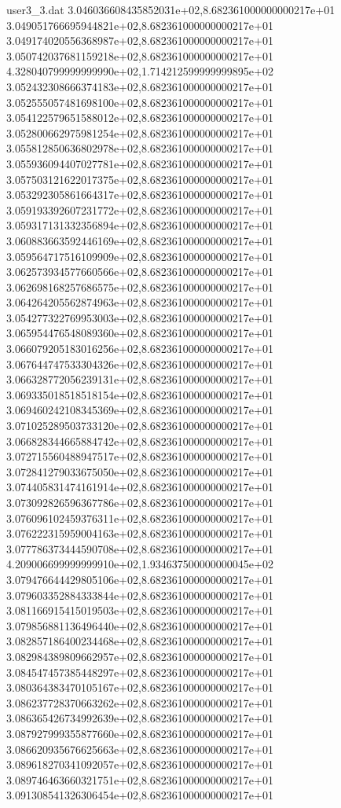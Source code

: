 \begin{filecontents}{user3_3.dat}
3.046036608435852031e+02,8.682361000000000217e+01
3.049051766695944821e+02,8.682361000000000217e+01
3.049174020556368987e+02,8.682361000000000217e+01
3.050742037681159218e+02,8.682361000000000217e+01
4.328040799999999990e+02,1.714212599999999895e+02
3.052432308666374183e+02,8.682361000000000217e+01
3.052555057481698100e+02,8.682361000000000217e+01
3.054122579651588012e+02,8.682361000000000217e+01
3.052800662975981254e+02,8.682361000000000217e+01
3.055812850636802978e+02,8.682361000000000217e+01
3.055936094407027781e+02,8.682361000000000217e+01
3.057503121622017375e+02,8.682361000000000217e+01
3.053292305861664317e+02,8.682361000000000217e+01
3.059193392607231772e+02,8.682361000000000217e+01
3.059317131332356894e+02,8.682361000000000217e+01
3.060883663592446169e+02,8.682361000000000217e+01
3.059564717516109909e+02,8.682361000000000217e+01
3.062573934577660566e+02,8.682361000000000217e+01
3.062698168257686575e+02,8.682361000000000217e+01
3.064264205562874963e+02,8.682361000000000217e+01
3.054277322769953003e+02,8.682361000000000217e+01
3.065954476548089360e+02,8.682361000000000217e+01
3.066079205183016256e+02,8.682361000000000217e+01
3.067644747533304326e+02,8.682361000000000217e+01
3.066328772056239131e+02,8.682361000000000217e+01
3.069335018518518154e+02,8.682361000000000217e+01
3.069460242108345369e+02,8.682361000000000217e+01
3.071025289503733120e+02,8.682361000000000217e+01
3.066828344665884742e+02,8.682361000000000217e+01
3.072715560488947517e+02,8.682361000000000217e+01
3.072841279033675050e+02,8.682361000000000217e+01
3.074405831474161914e+02,8.682361000000000217e+01
3.073092826596367786e+02,8.682361000000000217e+01
3.076096102459376311e+02,8.682361000000000217e+01
3.076222315959004163e+02,8.682361000000000217e+01
3.077786373444590708e+02,8.682361000000000217e+01
4.209006699999999910e+02,1.934637500000000045e+02
3.079476644429805106e+02,8.682361000000000217e+01
3.079603352884333844e+02,8.682361000000000217e+01
3.081166915415019503e+02,8.682361000000000217e+01
3.079856881136496440e+02,8.682361000000000217e+01
3.082857186400234468e+02,8.682361000000000217e+01
3.082984389809662957e+02,8.682361000000000217e+01
3.084547457385448297e+02,8.682361000000000217e+01
3.080364383470105167e+02,8.682361000000000217e+01
3.086237728370663262e+02,8.682361000000000217e+01
3.086365426734992639e+02,8.682361000000000217e+01
3.087927999355877660e+02,8.682361000000000217e+01
3.086620935676625663e+02,8.682361000000000217e+01
3.089618270341092057e+02,8.682361000000000217e+01
3.089746463660321751e+02,8.682361000000000217e+01
3.091308541326306454e+02,8.682361000000000217e+01

\end{filecontents}
